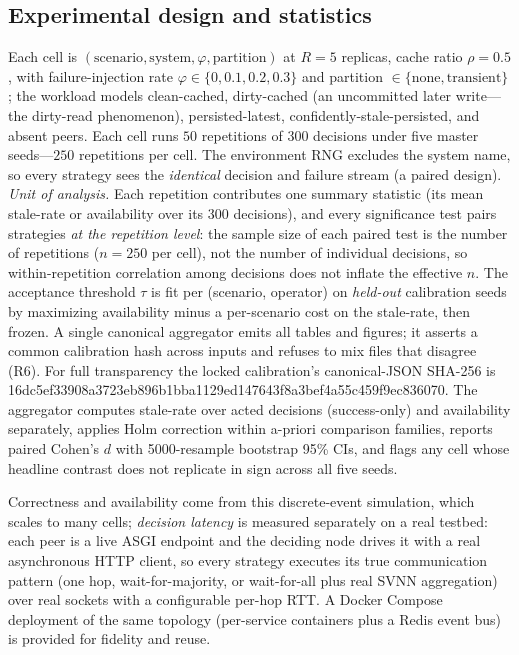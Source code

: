 \documentclass[fleqn,10pt]{wlscirep}
\begin{document}
\subsection{Experimental design and statistics}
Each cell is $(\text{scenario},\text{system},\varphi,\text{partition})$ at $R=5$ replicas, cache
ratio $\rho=0.5$, with failure-injection rate $\varphi\in\{0,0.1,0.2,0.3\}$ and partition
$\in\{\text{none},\text{transient}\}$; the workload models clean-cached, dirty-cached (an uncommitted
later write---the dirty-read phenomenon), persisted-latest, confidently-stale-persisted, and absent
peers. Each cell runs $50$ repetitions of $300$ decisions under five master seeds---$250$ repetitions
per cell. The environment RNG excludes the system name, so every strategy sees the \emph{identical}
decision and failure stream (a paired design). \emph{Unit of analysis.} Each repetition contributes one
summary statistic (its mean stale-rate or availability over its $300$ decisions), and every significance
test pairs strategies \emph{at the repetition level}: the sample size of each paired test is the number
of repetitions ($n=250$ per cell), not the number of individual decisions, so within-repetition
correlation among decisions does not inflate the effective $n$. The acceptance threshold $\tau$ is fit
per (scenario, operator) on \emph{held-out} calibration seeds by maximizing availability minus a
per-scenario cost on the stale-rate, then frozen. A single canonical aggregator emits all tables and
figures; it asserts a common calibration hash across inputs and refuses to mix files that disagree (R6).
For full transparency the locked calibration's canonical-JSON SHA-256 is
{\footnotesize\ttfamily 16dc5ef33908a3723eb896b1bba1129ed147643f8a3bef4a55c459f9ec836070}. The aggregator
computes stale-rate over acted decisions (success-only) and availability separately, applies Holm
correction within a-priori comparison families, reports paired Cohen's $d$ with 5000-resample bootstrap
95\% CIs, and flags any cell whose headline contrast does not replicate in sign across all five seeds.

Correctness and availability come from this discrete-event simulation, which scales to many cells;
\emph{decision latency} is measured separately on a real testbed: each peer is a live ASGI endpoint
and the deciding node drives it with a real asynchronous HTTP client, so every strategy executes its
true communication pattern (one hop, wait-for-majority, or wait-for-all plus real SVNN aggregation)
over real sockets with a configurable per-hop RTT. A Docker Compose deployment of the same topology
(per-service containers plus a Redis event bus) is provided for fidelity and reuse.
\end{document}

